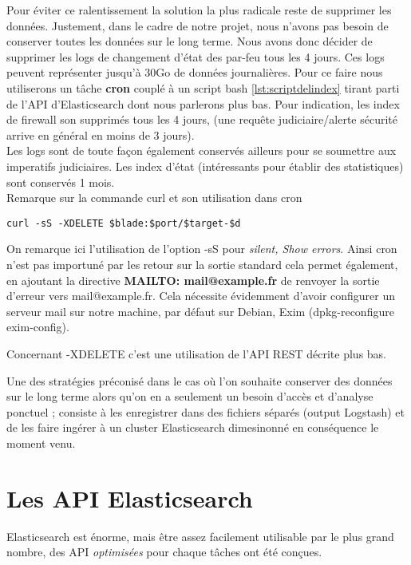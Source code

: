 Pour éviter ce ralentissement la solution la plus radicale reste de supprimer les 
données. Justement, dans le cadre de notre projet, nous n'avons pas besoin de conserver 
toutes les données sur le long terme. Nous avons donc décider de supprimer les logs 
de changement d'état des par-feu tous les 4 jours. Ces logs peuvent représenter 
jusqu'à 30Go de données journalières. 
Pour ce faire nous utiliserons un tâche \textbf{cron} couplé à un script bash 
\ref{lst:scriptdelindex} tirant parti de l'API d'Elasticsearch dont nous parlerons 
plus bas. Pour indication, les index de firewall son supprimés tous les 4 jours, 
(une requête judiciaire/alerte sécurité arrive en général en moins de 3 jours).\\ 
Les logs sont de toute façon également conservés ailleurs pour se soumettre aux 
imperatifs judiciaires. Les index d'état (intéressants pour établir des statistiques)
sont conservés 1 mois.\\
Remarque sur la commande curl et son utilisation dans cron

\begin{lstlisting}[style=code,label={lst:curlexemple},caption={Extrait de notre script \ref{lst:scriptdelindex}}]
curl -sS -XDELETE $blade:$port/$target-$d
\end{lstlisting}

On remarque ici l'utilisation de l'option -sS pour \textit{silent, Show errors}.
Ainsi cron n'est pas importuné par les retour sur la sortie standard cela permet
également, en ajoutant la directive \textbf{MAILTO: mail@example.fr} de renvoyer
la sortie d'erreur vers mail@example.fr. Cela nécessite évidemment d'avoir configurer
un serveur mail sur notre machine, par défaut sur Debian, Exim (dpkg-reconfigure 
exim-config).

Concernant -XDELETE c'est une utilisation de l'API REST décrite plus bas.

Une des stratégies préconisé dans le cas où l'on souhaite conserver des données sur
le long terme alors qu'on en a seulement un besoin d'accès et d'analyse ponctuel ;
consiste à les enregistrer dans des fichiers séparés (output Logstash) et de les 
faire ingérer à un cluster Elasticsearch dimesinonné en conséquence le moment venu.



\section{Les API Elasticsearch}
Elasticsearch est énorme, mais être assez facilement utilisable par le 
plus grand nombre, des \gls{API} \emph{optimisées} pour chaque tâches ont été conçues.

